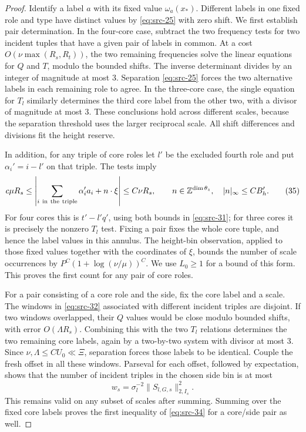 \begin{proof}
Identify a label $a$ with its fixed value $\omega_a(x_*)$.
Different labels in one fixed role and type have distinct values
by \eqref{eq:src-25} with zero shift.  We first establish pair
determination.  In the four-core case, subtract the two frequency
tests for two incident tuples that have a given pair of labels in
common.  At a cost $O(\nu\max(R_s,R_t))$, the two remaining
frequencies solve the linear equations for $Q$ and $T$, modulo
the bounded shifts.  The inverse determinant divides by an integer
of magnitude at most $3$.  Separation \eqref{eq:src-25} forces the
two alternative labels in each remaining role to agree.  In the
three-core case, the single equation for $T_l$ similarly determines
the third core label from the other two, with a divisor of magnitude
at most $3$.  These conclusions hold across different scales,
because the separation threshold uses the larger reciprocal scale.
All shift differences and divisions fit the height reserve.

In addition, for any triple of core roles let $l'$ be the excluded
fourth role and put $\alpha_i'=i-l'$ on that triple.  The tests imply
\begin{equation*}
 c\mu R_s\leq
 \left|\sum_{i\ \mathrm{in\ the\ triple}}
                   \alpha_i'a_i+n\cdot\xi\right|
 \leq C\nu R_s,
 \qquad n\in\mathbb Z^{\dim\theta_z},\quad |n|_\infty\leq CB'_h.
 \tag{35}\label{eq:src-35}
\end{equation*}
For four cores this is $t'-l'q'$, using both bounds in
\eqref{eq:src-31}; for three cores it is precisely the nonzero
$T_l$ test.  Fixing a pair fixes the whole core tuple, and hence
the label values in this annulus.  The height-bin observation,
applied to those fixed values together with the coordinates of
$\xi$, bounds the number of scale occurrences by
$P^C(1+\log(\nu/\mu))^C$.  We use $L_0\geq1$ for a bound of
this form.  This proves the first count for any pair of core roles.

For a pair consisting of a core role and the side, fix the core
label and a scale.  The windows in \eqref{eq:src-32} associated
with different incident triples are disjoint.  If two windows
overlapped, their $Q$ values would be close modulo bounded shifts,
with error $O(\Lambda R_s)$.  Combining this with the two $T_l$
relations determines the two remaining core labels, again by a
two-by-two system with divisor at most $3$.  Since
$\nu,\Lambda\leq CU_0\ll\Xi$, separation forces those labels
to be identical.  Couple the fresh offset in all these windows.
Parseval for each offset, followed by expectation, shows that the
number of incident triples in the chosen side bin is at most
\[
 w_s=\sigma_l^{-2}\|S_{l,G,s}\|_{2,I_s}^2.
\]
This remains valid on any subset of scales after summing.  Summing
over the fixed core labels proves the first inequality of
\eqref{eq:src-34} for a core/side pair as well.


\end{proof}
